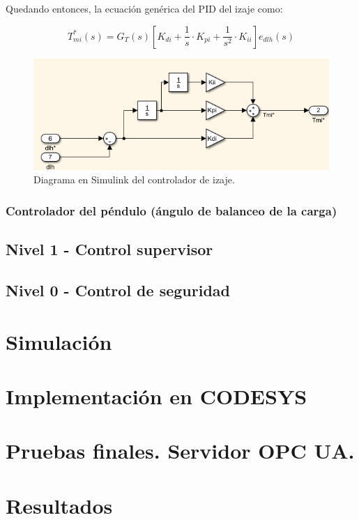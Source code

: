 \documentclass[11pt]{article}
\begin{document}
Quedando entonces, la ecuación genérica del PID del izaje como:

\begin{equation}
	\label{eq:sistema_izaje_simplificado_laplace_controlador}
	T_{mi}^{*}(s)=G_{T}(s)\left [ K_{di}+\frac{1}{s}\cdot K_{pi}+\frac{1}{s^{2}}\cdot K_{ii} \right ] e_{dlh}(s)
\end{equation}

\begin{figure}[h!]
	\centering
	\includegraphics[width=1\textwidth]{images/imagen_13_controlador_izaje.png}
	\caption{Diagrama en Simulink del controlador de izaje.}
	\label{fig:controlador_izaje_simulink}
\end{figure}



\subsubsection{Controlador del péndulo (ángulo de balanceo de la carga)}
\subsection{Nivel 1 - Control supervisor}
\subsection{Nivel 0 - Control de seguridad}

\section{Simulación}
\section{Implementación en CODESYS}
\section{Pruebas finales. Servidor OPC UA.}
\section{Resultados}
\end{document}
